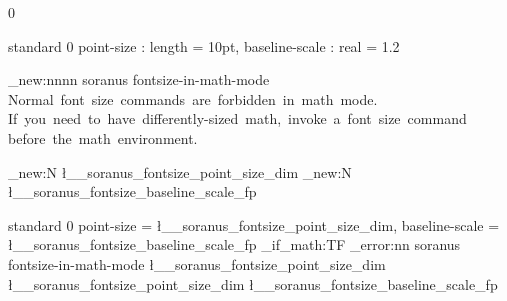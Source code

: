 %
%
%
% 
%


%

 { 0 }


 { standard } { 0 }
  {
    point-size               : length  = 10pt,
    baseline-scale           : real    = 1.2
  }


\msg_new:nnnn { soranus } { fontsize-in-math-mode }
  { Normal~font~size~commands~are~forbidden~in~math~mode. }
  {
    If~you~need~to~have~differently-sized~math,~invoke~a~font~size~command~
    before~the~math~environment.
  }


%


\dim_new:N \l__soranus_fontsize_point_size_dim
\fp_new:N \l__soranus_fontsize_baseline_scale_fp


 { standard } { 0 }
  {
    point-size               = \l__soranus_fontsize_point_size_dim,
    baseline-scale           = \l__soranus_fontsize_baseline_scale_fp
  }
  {
    \mode_if_math:TF
      { \msg_error:nn { soranus } { fontsize-in-math-mode } }
      {
        \AssignTemplateKeys
        \fontsize
          \l__soranus_fontsize_point_size_dim
          {
            \ScaleToNearestTenthPoint
              { \l__soranus_fontsize_point_size_dim }
              { \l__soranus_fontsize_baseline_scale_fp }
          }
        \selectfont
      }
  }


%

